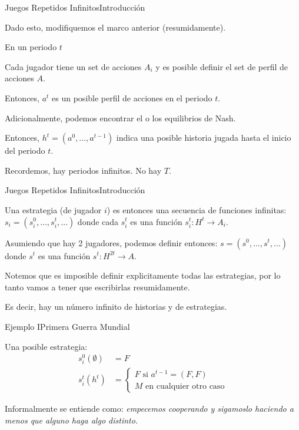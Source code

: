 \documentclass[notes, 11pt]{beamer} %
\newenvironment{wideitemize}{\itemize\addtolength{\itemsep}{10pt}}{\enditemize}
\begin{document}
\begin{frame}{Juegos Repetidos Infinitos}{Introducci\'on}
	\begin{wideitemize}
		\item<1-> Dado esto, modifiquemos el marco anterior (resumidamente).
		\item<2-> En un periodo $t$
			\begin{wideitemize}
				\item<3->[--] Cada jugador tiene un set de acciones $A_{i}$ y es posible definir el set de perfil de acciones $A$.
				\item<4->[--] Entonces, $a^{t}$ es un posible perfil de acciones en el periodo $t$.
				\item<5->[--] Adicionalmente, podemos encontrar el o los equilibrios de Nash.
			\end{wideitemize}
		\item<6-> Entonces, $h^{t} = (a^{0}, \dots, a^{t-1})$ indica una posible historia jugada hasta el inicio del periodo $t$.
		\item<7-> Recordemos, hay periodos infinitos. No hay $T$.
	\end{wideitemize}
\end{frame}

\begin{frame}{Juegos Repetidos Infinitos}{Introducci\'on}
	\begin{wideitemize}
		\item<1-> Una estrategia (de jugador $i$) es entonces una secuencia de funciones infinitas: $s_{i} = (s_{i}^{0}, \dots, s_{i}^{t}, \dots )$ donde cada $s_{i}^{t}$ es una funci\'on $s_{i}^{t}: H^{t} \rightarrow A_{i}$.
		\item<2-> Asumiendo que hay 2 jugadores, podemos definir entonces: $s = (s^{0}, \dots, s^{t}, \dots)$ donde $s^{t}$ es una funci\'on $s^{t}: H^{2t} \rightarrow A$.
		\item<3-> Notemos que es imposible definir explicitamente todas las estrategias, por lo tanto vamos a tener que escribirlas resumidamente.
		\item<4-> Es decir, hay un n\'umero infinito de historias y de estrategias.
	\end{wideitemize}
\end{frame}

\begin{frame}{Ejemplo I}{Primera Guerra Mundial}
	\begin{wideitemize}
		\item<1-> Una posible estrategia: 
		\begin{align*}
			s_{i}^{0}(\emptyset) &= F \\
			s_{i}^{t}(h^{t}) &= \begin{cases}
				F \text{ si } a^{t-1} = (F,F) \\
				M \text{ en cualquier otro caso}
			\end{cases}
		\end{align*}
		\item<2-> Informalmente se entiende como: \textit{empecemos cooperando y sigamoslo haciendo a menos que alguno haga algo distinto.}
	\end{wideitemize}
\end{frame}
\end{document}
